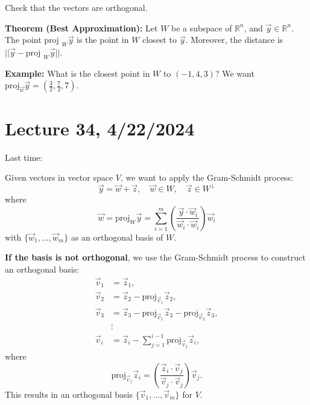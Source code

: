 \documentclass{article}
\begin{document}
Check that the vectors are orthogonal.

\textbf{Theorem (Best Approximation):} Let $W$ be a subspace of $\mathbb{R}^n$, and $\vec{y} \in \mathbb{R}^n$. The point $\text{proj }_W \vec{y}$ is the point in $W$ closest to $\vec{y}$. Moreover, the distance is $||\vec{y} - \text{proj }_W \vec{y}||$.

\textbf{Example:} What is the closest point in $W$ to $(-1, 4, 3)$? We want $\text{proj}_{\vec{w}} \vec{y} = \left( \frac{3}{2}, \frac{7}{2}, 7 \right)$.


\section{Lecture 34, 4/22/2024}


Last time:


Given vectors in vector space $V$, we want to apply the Gram-Schmidt process:
\[
\vec{y} = \vec{w} + \vec{z}, \quad \vec{w} \in W, \quad \vec{z} \in W^{\perp}
\]
where
\[
\vec{w} = \text{proj}_{W} \vec{y} = \sum_{i=1}^m \left(\frac{\vec{y} \cdot \vec{w}_i}{\vec{w}_i \cdot \vec{w}_i}\right) \vec{w}_i
\]
with $\{\vec{w}_1, \ldots, \vec{w}_m\}$ as an orthogonal basis of $W$.

\textbf{If the basis is not orthogonal}, we use the Gram-Schmidt process to construct an orthogonal basis:
\[
\begin{aligned}
\vec{v}_1 &= \vec{z}_1, \\
\vec{v}_2 &= \vec{z}_2 - \text{proj}_{\vec{v}_1} \vec{z}_2, \\
\vec{v}_3 &= \vec{z}_3 - \text{proj}_{\vec{v}_1} \vec{z}_3 - \text{proj}_{\vec{v}_2} \vec{z}_3, \\
&\vdots \\
\vec{v}_i &= \vec{z}_i - \sum_{j=1}^{i-1} \text{proj}_{\vec{v}_j} \vec{z}_i,
\end{aligned}
\]
where
\[
\text{proj}_{\vec{v}_j} \vec{z}_i = \left(\frac{\vec{z}_i \cdot \vec{v}_j}{\vec{v}_j \cdot \vec{v}_j}\right) \vec{v}_j.
\]
This results in an orthogonal basis $\{\vec{v}_1, \ldots, \vec{v}_m\}$ for $V$.
\end{document}
